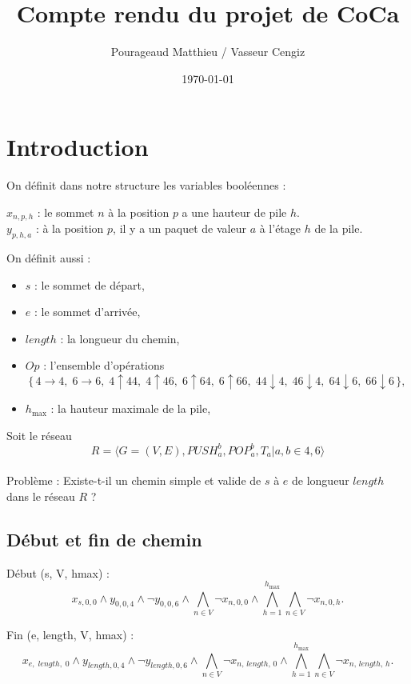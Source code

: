 \documentclass{article}
\title{Compte rendu du projet de CoCa}
\author{Pourageaud Matthieu / Vasseur Cengiz}
\date{\today}
\begin{document}
\maketitle

\section{Introduction}

On définit dans notre structure les variables booléennes :

\medskip

\noindent
$x_{n,p,h}$ : le sommet $n$ à la position $p$ a une hauteur de pile $h$.\\
$y_{p,h,a}$ : à la position $p$, il y a un paquet de valeur $a$ à l'étage $h$ de la pile.

\medskip

On définit aussi :
\begin{itemize}
  \item $s$ : le sommet de départ,
  \item $e$ : le sommet d'arrivée,
  \item $length$ : la longueur du chemin,
  \item $Op$ : l'ensemble d'opérations
  \[
    \{\,4 \to 4,\; 6 \to 6,\; 4 \uparrow 44,\; 4 \uparrow 46,\; 6 \uparrow 64,\; 6 \uparrow 66,\; 44 \downarrow 4,\; 46 \downarrow 4,\; 64 \downarrow 6,\; 66 \downarrow 6\,\},
  \]
  \item $h_{\max}$ : la hauteur maximale de la pile,
\end{itemize}

Soit le réseau \[R = ⟨G = (V, E), PUSH_{a}^{b}, POP_{a}^{b}, T_{a} | a,b \in {4, 6}⟩\]\\
Problème : Existe-t-il un chemin simple et valide de $s$ à $e$ de longueur $length$ dans le réseau $R$ ?

\subsection{Début et fin de chemin}

Début (s, V, hmax) :
\[
x_{s,0,0} \land y_{0,0,4} \land \lnot y_{0,0,6}
\land \bigwedge_{n\in V} \lnot x_{n,0,0}
\land \bigwedge_{h=1}^{h_{\max}} \bigwedge_{n\in V} \lnot x_{n,0,h}.
\]

Fin (e, length, V, hmax) :
\[
x_{e,\;length,\;0} \land y_{length,0,4} \land \lnot y_{length,0,6}
\land \bigwedge_{n\in V} \lnot x_{n,\,length,\,0}
\land \bigwedge_{h=1}^{h_{\max}} \bigwedge_{n\in V} \lnot x_{n,\,length,\,h}.
\]
\end{document}
